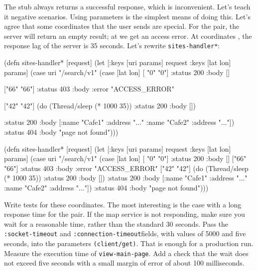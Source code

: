 
The stub always returns a successful response, which is inconvenient. Let's teach it negative scenarios. Using parameters is the simplest means of doing this. Let's agree that some coordinates that the user sends are special. For the  pair, the server will return an empty result; at  we get an access error. At coordinates , the response lag of the server is 35 seconds. Let's rewrite \verb|sites-handler*|:

\ifx\DEVICETYPE\MOBILE

\begin{english}
  \begin{clojure}
(defn sites-handler* [request]
  (let [{:keys [uri params]} request
        {:keys [lat lon]} params]
    (case uri
      "/search/v1"
      (case [lat lon]
        [ "0"  "0"]
        {:status 200 :body []}

        ["66" "66"]
        {:status 403
         :body {:error "ACCESS_ERROR"}}

        ["42" "42"]
        (do (Thread/sleep (* 1000 35))
            {:status 200 :body []})

        {:status 200
         :body [{:name "Cafe1"
                 :address "..."}
                {:name "Cafe2"
                 :address "..."}]})
      {:status 404
       :body "page not found"})))
  \end{clojure}
\end{english}

\else

\begin{english}
  \begin{clojure}
(defn sites-handler* [request]
  (let [{:keys [uri params]} request
        {:keys [lat lon]} params]
    (case uri
      "/search/v1"
      (case [lat lon]
        [ "0"  "0"] {:status 200 :body []}
        ["66" "66"] {:status 403 :body {:error "ACCESS_ERROR"}}
        ["42" "42"] (do (Thread/sleep (* 1000 35))
                        {:status 200 :body []})
        {:status 200
         :body [{:name "Cafe1" :address "..."}
                {:name "Cafe2" :address "..."}]})
      {:status 404 :body "page not found"})))
  \end{clojure}
\end{english}

\fi


Write tests for these coordinates. The most interesting is the case with a long response time for the  pair. If the map service is not responding, make sure you wait for a reasonable time, rather than the standard 30 seconds. Pass the \verb|:socket-timeout| and \verb|:connection-timeout|fields, with values of 5000 and five seconds, into the parameters \verb|(client/get)|. That is enough for a production run. Measure the execution time of \verb|view-main-page|. Add a check that the wait does not exceed five seconds with a small margin of error of about 100 milliseconds.

